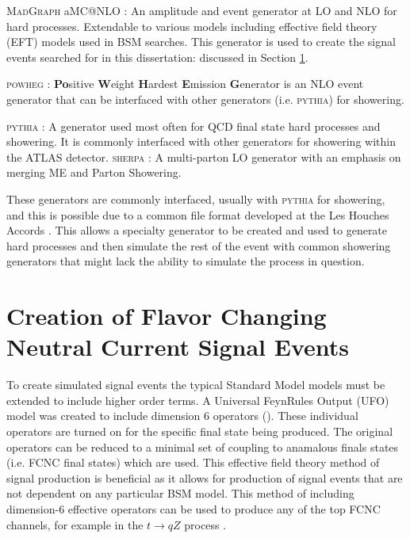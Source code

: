 \textsc{MadGraph} aMC@NLO \cite{MadGraph}: An amplitude and event generator at LO and NLO for hard processes.  Extendable to various models including effective field theory (EFT) models used in BSM searches.  This generator is used to create the signal events searched for in this dissertation: discussed in Section \ref{Sec:MG5Sig}. 

\textsc{powheg} \cite{Powheg1,Powheg2}: \textbf{Po}sitive \textbf{W}eight \textbf{H}ardest \textbf{E}mission \textbf{G}enerator is an NLO event generator that can be interfaced with other generators (i.e. \textsc{pythia}) for showering.

\textsc{pythia} \cite{Pythia8}: A generator used most often for QCD final state hard processes and showering.  It is commonly interfaced with other generators for showering within the ATLAS detector.
\textsc{sherpa} \cite{Sherpa11,Sherpa22}: A multi-parton LO generator with an emphasis on merging ME and Parton Showering.

These generators are commonly interfaced, usually with \textsc{pythia} for showering, and this is possible due to a common file format developed at the Les Houches Accords \cite{Alwall:2006yp}.  This allows a specialty generator to be created and used to generate hard processes and then simulate the rest of the event with common showering generators that might lack the ability to simulate the process in question.



\section{Creation of Flavor Changing Neutral Current Signal Events}
\label{Sec:MG5Sig}
To create simulated signal events the typical Standard Model models must be extended to include higher order terms.  A Universal FeynRules Output (UFO)  \cite{UFOModel} model was created to include dimension 6 operators (\cite{Dim6TermsOld, Dim6Terms}).  These individual operators are turned on for the specific final state being produced.  The original operators can be reduced to a minimal set of coupling to anamalous finals states (i.e. FCNC final states) \cite{TopCouplingsAguilarSaavedra} which are used.  This effective field theory method of signal production is beneficial as it allows for production of signal events that are not dependent on any particular BSM model.  This method of including dimension-6 effective operators can be used to produce any of the top FCNC channels, for example in the $t\rightarrow qZ$ process \cite{FCNCtqZ}.

